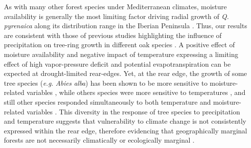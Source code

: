 As with many other forest species under Mediterranean climates, moisture availability is generally the most limiting factor driving radial growth of \emph{Q. pyrenaica} along its distribution range in the Iberian Peninsula \autocite{GeaIzquierdoCanellas2014LocalClimate}. Thus, our results are consistent with those of previous studies highlighting the influence of precipitation on tree-ring growth in different oak species \autocites[\emph{e.g.}][]{Tessieretal1994DeciduousQuercus,DiFilippoetal2010ClimateChange,GeaIzquierdoetal2011TreeringsReflect,GarciaGonzalezSoutoHerrero2017EarlywoodVessel}. A positive effect of moisture availability and negative impact of temperature expressing a limiting effect of high vapor-pressure deficit and potential evapotranspiration can be expected at drought-limited rear-edges. Yet, at the rear edge, the growth of some tree species (\emph{e.g.} \emph{Abies alba}) has been shown to be more sensitive to moisture-related variables \autocite{MartinezSanchoGutierrezMerino2019EvidenceThat}, while others species were more sensitive to temperatures \autocite[\emph{e.g.} \emph{Pinus sylvestris},][]{Herreroetal2013VaryingClimate}, and still other species responded simultaneously to both temperature and moisture-related variables \autocites[\emph{e.g.} \emph{Fagus sylvatica},][]{DoradoLinanetal2017CoexistenceMediterraneanTemperate,DoradoLinanetal2017ClimateThreats}[\emph{Pinus nigra} subsp. \emph{salzmanii},][]{SanchezSalgueroetal2012DroughtMain}. This diversity in the response of tree species to precipitation and temperature suggests that vulnerability to climate change is not consistently expressed within the rear edge, therefore evidencing that geographically marginal forests are not necessarily climatically or ecologically marginal \autocite[see][ and references therein]{DoradoLinanetal2019GeographicalAdaptation}.

